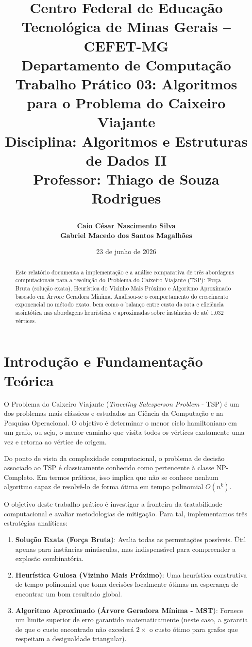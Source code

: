 \documentclass[12pt,a4paper]{article}
\title{
    \vspace{-2cm}
    \begin{center}
        \Large \textbf{Centro Federal de Educação Tecnológica de Minas Gerais -- CEFET-MG}\\
        \large Departamento de Computação\\
        \vspace{1cm}
        \textbf{Trabalho Prático 03: Algoritmos para o Problema do Caixeiro Viajante}\\
        \normalsize Disciplina: Algoritmos e Estruturas de Dados II\\
        \normalsize Professor: Thiago de Souza Rodrigues
    \end{center}
}
\author{
    \textbf{Caio César Nascimento Silva} \\
    \textbf{Gabriel Macedo dos Santos Magalhães}
}
\date{23 de junho de 2026}
\begin{document}
\maketitle
\thispagestyle{empty}

\begin{abstract}
    Este relatório documenta a implementação e a análise comparativa de três abordagens computacionais para a resolução do Problema do Caixeiro Viajante (TSP): Força Bruta (solução exata), Heurística do Vizinho Mais Próximo e Algoritmo Aproximado baseado em Árvore Geradora Mínima. Analisou-se o comportamento do crescimento exponencial no método exato, bem como o balanço entre custo da rota e eficiência assintótica nas abordagens heurísticas e aproximadas sobre instâncias de até 1.032 vértices.
\end{abstract}

\vspace{0.5cm}

\tableofcontents
\newpage

\section{Introdução e Fundamentação Teórica}

O Problema do Caixeiro Viajante (\textit{Traveling Salesperson Problem} - TSP) é um dos problemas mais clássicos e estudados na Ciência da Computação e na Pesquisa Operacional. O objetivo é determinar o menor ciclo hamiltoniano em um grafo, ou seja, o menor caminho que visita todos os vértices exatamente uma vez e retorna ao vértice de origem.

Do ponto de vista da complexidade computacional, o problema de decisão associado ao TSP é classicamente conhecido como pertencente à classe NP-Completo. Em termos práticos, isso implica que não se conhece nenhum algoritmo capaz de resolvê-lo de forma ótima em tempo polinomial $O(n^k)$.

O objetivo deste trabalho prático é investigar a fronteira da tratabilidade computacional e avaliar metodologias de mitigação. Para tal, implementamos três estratégias analíticas:
\begin{enumerate}
    \item \textbf{Solução Exata (Força Bruta)}: Avalia todas as permutações possíveis. Útil apenas para instâncias minúsculas, mas indispensável para compreender a explosão combinatória.
    \item \textbf{Heurística Gulosa (Vizinho Mais Próximo)}: Uma heurística construtiva de tempo polinomial que toma decisões localmente ótimas na esperança de encontrar um bom resultado global.
    \item \textbf{Algoritmo Aproximado (Árvore Geradora Mínima - MST)}: Fornece um limite superior de erro garantido matematicamente (neste caso, a garantia de que o custo encontrado não excederá $2 \times$ o custo ótimo para grafos que respeitam a desigualdade triangular).
\end{enumerate}
\end{document}
